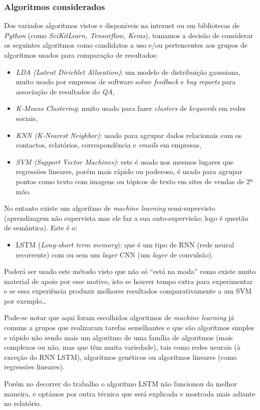 \subsubsection{Algoritmos considerados}

Dos variados algoritmos vistos e disponíveis na internet ou em bibliotecas de \textit{Python} (como \textit{SciKitLearn, Tensorflow, Keras}), tomamos a decisão de considerar os seguintes algoritmos como candidatos a uso e/ou pertencentes aos grupos de algoritmos usados para comparação de resultados:
\begin{itemize}
  \item \textit{LDA (Latent Dirichlet Allocation)}: um modelo de distribuição gaussiana, muito usado por empresas de software sobre \textit{feedback} e \textit{bug reports} para associação de resultados do \textit{QA},
  \item \textit{K-Means Clustering}: muito usado para fazer \textit{clusters} de \textit{keywords} em redes sociais,
  \item \textit{KNN (K-Nearest Neighbor)}: usado para agrupar dados relacionais com os contactos, relatórios, correspondência e \textit{emails} em empresas,
  \item \textit{SVM (Support Vector Machines)}: este é usado nos mesmos lugares que regressões lineares, porém mais rápido ou poderoso, é usado para agrupar pontos como texto com imagens ou tópicos de texto em sites de vendas de 2ª mão.
\end{itemize}

No entanto existe um algoritmo de \textit{machine learning} semi-supervisto (aprendizagem não supervista mas ele faz a sua auto-supervisão; logo é questão de semântica).
Este é o:
\begin{itemize}
  \item LSTM (\textit{Long-short term memory}): que é um tipo de RNN (rede neural recorrente) com ou sem um \textit{layer} CNN (um \textit{layer} de convulsão).
\end{itemize}

Poderá ser usado este método visto que não só ``está na moda'' como existe muito material de apoio por esse motivo, isto se houver tempo extra para experimentar e se essa experiência produzir melhores resultados comparativamente a um SVM por exemplo\ldots

Pode-se notar que aqui foram escolhidos algoritmos de \textit{machine learning} já comuns a grupos que realizaram tarefas semelhantes e que são algoritmos simples e rápido não sendo mais um algoritmo de uma família de algoritmos (mais complexos ou não, mas que têm muita variedade), tais como redes neurais (à exceção do RNN LSTM), algoritmos genéticos ou algoritmos lineares (como regressões lineares).

Porém no decorrer do trabalho o algoritmo LSTM não funcionou da melhor maneira, e optámos por outra técnica que será explicada e mostrada mais adiante no relatório.





